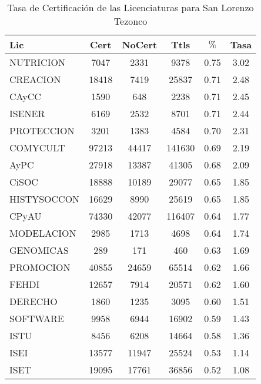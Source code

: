 \documentclass[12pt]{article}
\begin{document}
\begin{table}[h]
\centering
\begin{tabular}{|l|cc|c|cc|}\hline
Lic & Cert & NoCert & Ttls & $\%$ & Tasa \\\hline\hline
NUTRICION & 7047 & 2331 & 9378 & 0.75 & 3.02 \\\hline\hline
CREACION & 18418 & 7419 & 25837 & 0.71 & 2.48 \\
CAyCC & 1590 & 648 & 2238 & 0.71 & 2.45 \\
ISENER & 6169 & 2532 & 8701 & 0.71 & 2.44 \\
PROTECCION & 3201 & 1383 & 4584 & 0.70 & 2.31 \\
COMYCULT & 97213 & 44417 & 141630 & 0.69 & 2.19 \\
AyPC & 27918 & 13387 & 41305 & 0.68 & 2.09 \\\hline\hline
CiSOC & 18888 & 10189 & 29077 & 0.65 & 1.85 \\
HISTYSOCCON & 16629 & 8990 & 25619 & 0.65 & 1.85 \\
CPyAU & 74330 & 42077 & 116407 & 0.64 & 1.77 \\
MODELACION & 2985 & 1713 & 4698 & 0.64 & 1.74 \\
GENOMICAS & 289 & 171 & 460 & 0.63 & 1.69 \\
PROMOCION & 40855 & 24659 & 65514 & 0.62 & 1.66 \\
FEHDI & 12657 & 7914 & 20571 & 0.62 & 1.60 \\\hline
DERECHO & 1860 & 1235 & 3095 & 0.60 & 1.51 \\
SOFTWARE & 9958 & 6944 & 16902 & 0.59 & 1.43 \\
ISTU & 8456 & 6208 & 14664 & 0.58 & 1.36 \\
ISEI & 13577 & 11947 & 25524 & 0.53 & 1.14 \\
ISET & 19095 & 17761 & 36856 & 0.52 & 1.08 \\\hline\hline
\end{tabular}
\caption{Tasa de Certificación de las Licenciaturas para San Lorenzo Tezonco}
\end{table}
\end{document}
